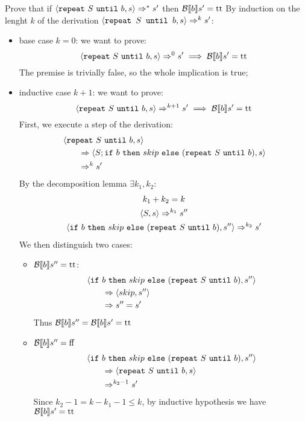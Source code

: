 \begin{exercise}{
    Prove that if $\left<\texttt{repeat}\ S\ \texttt{until}\ b, s\right> \Rightarrow^* s'$ then $\mathcal{B} \llbracket b \rrbracket s' = \text{tt}$
}
    By induction on the lenght $k$ of the derivation $\left<\texttt{repeat } S \texttt{ until } b, s\right> \Rightarrow^k s'$:
    \begin{itemize}
        \item base case $k=0$: we want to prove:
            \[ \left<\texttt{repeat}\ S\ \texttt{until}\ b, s\right> \Rightarrow^0 s' \implies \mathcal{B} \llbracket b \rrbracket s' = \text{tt} \]
            The premise is trivially false, so the whole implication is true;
        \item inductive case $k+1$: we want to prove:
            \[ \left<\texttt{repeat}\ S\ \texttt{until}\ b, s\right> \Rightarrow^{k+1} s' \implies \mathcal{B} \llbracket b \rrbracket s' = \text{tt} \]
            First, we execute a step of the derivation:
            \begin{align*}
                &\left<\texttt{repeat}\ S\ \texttt{until}\ b, s\right>
                \\&\qquad \Rightarrow \left<S; \texttt{if}\ b\ \texttt{then}\ skip\ \texttt{else}\ (\texttt{repeat}\ S\ \texttt{until}\ b), s\right>
                \\&\qquad \Rightarrow^k s'
            \end{align*}
            By the decomposition lemma $\exists k_1, k_2 :$
            \begin{gather*}
                k_1 + k_2 = k \\
                \left<S, s\right> \Rightarrow^{k_1} s'' \\
                \left<\texttt{if}\ b\ \texttt{then}\ skip\ \texttt{else}\ (\texttt{repeat}\ S\ \texttt{until}\ b), s''\right> \Rightarrow^{k_2} s'
            \end{gather*}
            We then distinguish two cases:
            \begin{itemize}
                \item $\mathcal{B} \llbracket b \rrbracket s'' = \text{tt}$:
                    \begin{align*}
                        &\left<\texttt{if}\ b\ \texttt{then}\ skip\ \texttt{else}\ (\texttt{repeat}\ S\ \texttt{until}\ b), s''\right>
                        \\&\qquad \Rightarrow \left<skip, s''\right>
                        \\&\qquad \Rightarrow s'' = s'
                    \end{align*}
                    Thus $\mathcal{B} \llbracket  b \rrbracket s'' = \mathcal{B} \llbracket  b \rrbracket s' = \text{tt}$
                \item $\mathcal{B} \llbracket  b \rrbracket s'' = \text{ff}$
                    \begin{align*}
                        &\left<\texttt{if}\ b\ \texttt{then}\ skip\ \texttt{else}\ (\texttt{repeat}\ S\ \texttt{until}\ b), s''\right>
                        \\&\qquad \Rightarrow \left<\texttt{repeat}\ S\ \texttt{until}\ b, s\right>
                        \\&\qquad \Rightarrow^{k_2 - 1} s'
                    \end{align*}
                    Since $k_2 - 1 = k - k_1 - 1 \leq k$, by inductive hypothesis we have $\mathcal{B} \llbracket  b \rrbracket s' = \text{tt}$
            \end{itemize}
    \end{itemize}
\end{exercise}

